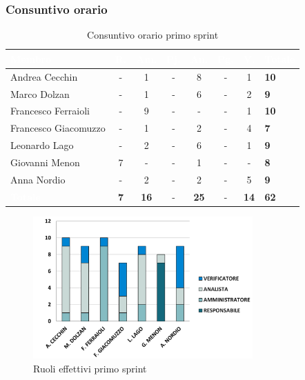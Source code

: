 \subsubsection{Consuntivo orario}
{
\setlength{\tabcolsep}{10pt}
\renewcommand{\arraystretch}{1.5}
\begin{table}[h!]
    \centering
    \begin{tabularx}{\textwidth}{| l | c | c | c | c | c | c | X |}
        \hline
        \rowcolor{headerrow} \textbf{\textcolor{white}{Membro}} & \textbf{\textcolor{white}{R.}} & \textbf{\textcolor{white}{Am.}} & \textbf{\textcolor{white}{Pj.}} & \textbf{\textcolor{white}{An.}} & \textbf{\textcolor{white}{Pg.}} & \textbf{\textcolor{white}{V.}} & \textbf{\textcolor{white}{Totale}} \\
        \hline
        Andrea Cecchin & - & 1 & - & 8 & - & 1 & \textbf{10} \\
        \hline
        Marco Dolzan & - & 1 & - & 6 & - & 2 & \textbf{9} \\
        \hline
        Francesco Ferraioli & - & 9 & - & - & - & 1 & \textbf{10} \\
        \hline  
        Francesco Giacomuzzo & - & 1 & - & 2 & - & 4 & \textbf{7} \\
        \hline
        Leonardo Lago & - & 2 & - & 6 & - & 1 & \textbf{9} \\
        \hline
        Giovanni Menon & 7 & - & - & 1 & - & - & \textbf{8} \\
        \hline
        Anna Nordio & - & 2 & - & 2 & - & 5 & \textbf{9} \\
        \hline
    \cellcolor{headerrow} \textbf{\textcolor{white}{Totale}} & \textbf{7} & \textbf{16} & - & \textbf{25} & - & \textbf{14} & \textbf{62} \\
        \hline
    \end{tabularx} 
    \caption{Consuntivo orario primo sprint}
    \label{tab:consuntivoorarioprimosprint}
\end{table}
}

\begin{figure}[h!]
    \centering
    \includegraphics[width=0.75\textwidth]{cons1ruoli.png}
    \caption{Ruoli effettivi primo sprint}
    \label{fig:consuntivoorarioprimosprint}
\end{figure}

